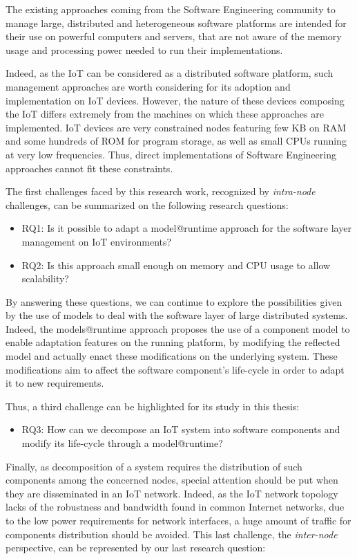 The existing approaches coming from the Software Engineering community to manage large, distributed and heterogeneous software platforms are intended for their use on powerful computers and servers, that are not aware of the memory usage and processing power needed to run their implementations.

Indeed, as the IoT can be considered as a distributed software platform, such management approaches are worth considering for its adoption and implementation on IoT devices.
However, the nature of these devices composing the IoT differs extremely from the machines on which these approaches are implemented.
IoT devices are very constrained nodes featuring few KB on RAM and some hundreds of ROM for program storage, as well as small CPUs running at very low frequencies.
Thus, direct implementations of Software Engineering approaches cannot fit these constraints.

The first challenges faced by this research work, recognized by \textit{intra-node} challenges, can be summarized on the following research questions:

\begin{itemize}
	\item RQ1: Is it possible to adapt a model@runtime approach for the software layer management on IoT environments?
	\item RQ2: Is this approach small enough on memory and CPU usage to allow scalability?
\end{itemize}

By answering these questions, we can continue to explore the possibilities given by the use of models to deal with the software layer of large distributed systems.
Indeed, the models@runtime approach proposes the use of a component model to enable adaptation features on the running platform, by modifying the reflected model and actually enact these modifications on the underlying system.
These modifications aim to affect the software component's life-cycle in order to adapt it to new requirements.

Thus, a third challenge can be highlighted for its study in this thesis:

\begin{itemize}
	\item RQ3: How can we decompose an IoT system into software components and modify its life-cycle through a model@runtime?
\end{itemize}

Finally, as decomposition of a system requires the distribution of such components among the concerned nodes, special attention should be put when they are disseminated in an IoT network.
Indeed, as the IoT network topology lacks of the robustness and bandwidth found in common Internet networks, due to the low power requirements for network interfaces, a huge amount of traffic for components distribution should be avoided.
This last challenge, the \textit{inter-node} perspective, can be represented by our last research question:

